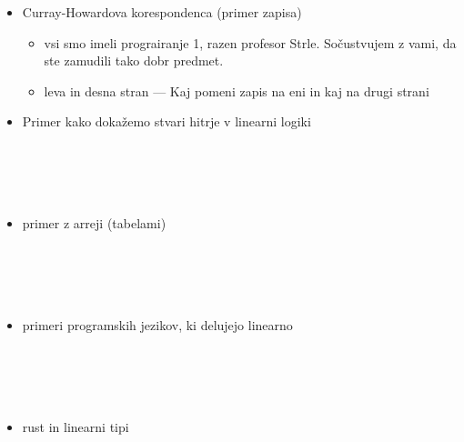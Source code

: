 \documentclass[12pt, titlepage, a4paper]{article}
\begin{document}
\begin{itemize}
    \item  Curray-Howardova korespondenca (primer zapisa)
    \begin{itemize}
        \item vsi smo imeli prograiranje 1, razen profesor Strle. Sočustvujem z vami, da ste zamudili tako dobr predmet.
    \end{itemize}
    
    \begin{itemize}
        \item leva in desna stran --- Kaj pomeni zapis na eni in kaj na drugi strani
        
    \end{itemize}



    \item Primer kako dokažemo stvari hitrje v linearni logiki
\\
\\
\\
\\
\\
    \item primer z arreji (tabelami)
\\
\\
\\
\\
\\
    \item primeri programskih jezikov, ki delujejo linearno
\\
\\
\\
\\
\\
    \item rust in linearni tipi
\end{itemize}
\end{document}
